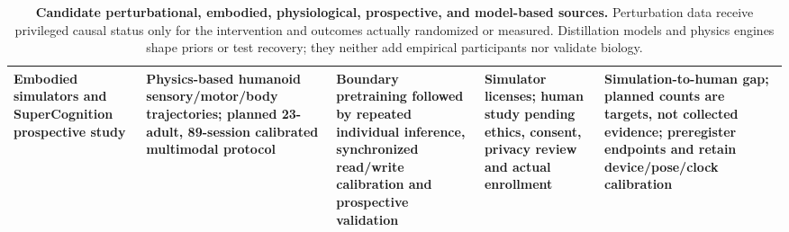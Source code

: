 \begin{table}[!h]
\begin{tabularx}{\textwidth}{@{}p{}p{}p{}p{}X@{}}
Embodied simulators and SuperCognition prospective study &
Physics-based humanoid sensory/motor/body trajectories; planned 23-adult,
89-session calibrated multimodal protocol &
Boundary pretraining followed by repeated individual inference, synchronized
read/write calibration and prospective validation &
Simulator licenses; human study pending ethics, consent, privacy review and
actual enrollment &
Simulation-to-human gap; planned counts are targets, not collected evidence;
preregister endpoints and retain device/pose/clock calibration\\
\bottomrule
\end{tabularx}
\caption{\textbf{Candidate perturbational, embodied, physiological,
prospective, and model-based sources.} Perturbation data receive privileged
causal status only for the intervention and outcomes actually randomized or
measured. Distillation models and physics engines shape priors or test
recovery; they neither add empirical participants nor validate biology.}
\label{tab:appendix-perturbation}
\end{table}

